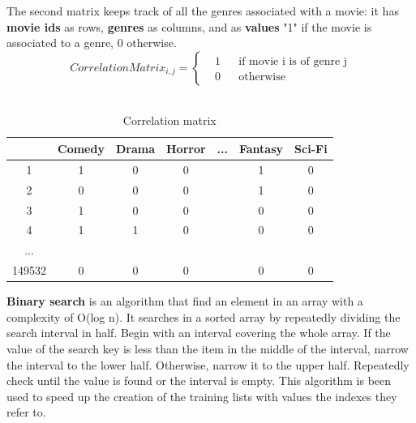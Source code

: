 \documentclass{article}
\begin{document}
The second matrix keeps track of all the genres associated with a movie: it has \textbf{movie ids} as rows, \textbf{genres} as columns, and as \textbf{values} "1" if the movie is associated to a genre, 0 otherwise. \\

\begin{equation}
      \label{eqn:movieMatrix}
      CorrelationMatrix_{i,j} = \left \{
            \begin{aligned}
                  &1 && \text{if movie i is of genre j}\\
                  &0 && \text{otherwise}
            \end{aligned} \right.
\end{equation} \\ 

\begin{table}[ht]
      \begin{center}
            \begin{tabular}{ | c | c | c | c | c | c | c |} 
              \hline
              \rowcolor{lightgray}  & Comedy & Drama & Horror & ... & Fantasy & Sci-Fi \\ 
              \hline
               \cellcolor{lightgray}1 & 1 & 0 & 0 &  & 1 & 0 \\ 
              \hline
              \cellcolor{lightgray}2 & 0 & 0 & 0 &  & 1 & 0 \\ 
              \hline
              \cellcolor{lightgray}3 & 1 & 0 & 0 &  & 0 & 0\\
              \hline
              \cellcolor{lightgray}4 & 1 & 1 & 0 &  & 0 & 0\\
              \hline
              \cellcolor{lightgray}... &  &  &  &  &  & \\ 
              \hline
              \cellcolor{lightgray}149532 & 0 & 0 & 0 &  & 0 & 0\\
              \hline
            \end{tabular}
            \caption{Correlation matrix}
            \label{Tab: Correlation matrix}
      \end{center}
\end{table}


\newpage
\textbf{Binary search} is an algorithm that find an element in an array with a complexity of O(log n). It searches in a sorted array by repeatedly dividing the search interval in half. Begin with an interval covering the whole array. If the value of the search key is less than the item in the middle of the interval, narrow the interval to the lower half. Otherwise, narrow it to the upper half. Repeatedly check until the value is found or the interval is empty.
This algorithm is been used to speed up the creation of the training lists with values the indexes they refer to.\\
\end{document}

